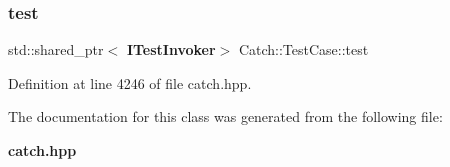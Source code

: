 \subsubsection{test}
{\footnotesize\ttfamily std\+::shared\+\_\+ptr$<$\textbf{ I\+Test\+Invoker}$>$ Catch\+::\+Test\+Case\+::test\hspace{0.3cm}{\ttfamily [private]}}



Definition at line 4246 of file catch.\+hpp.



The documentation for this class was generated from the following file\+:\begin{DoxyCompactItemize}
\item 
\textbf{ catch.\+hpp}\end{DoxyCompactItemize}
